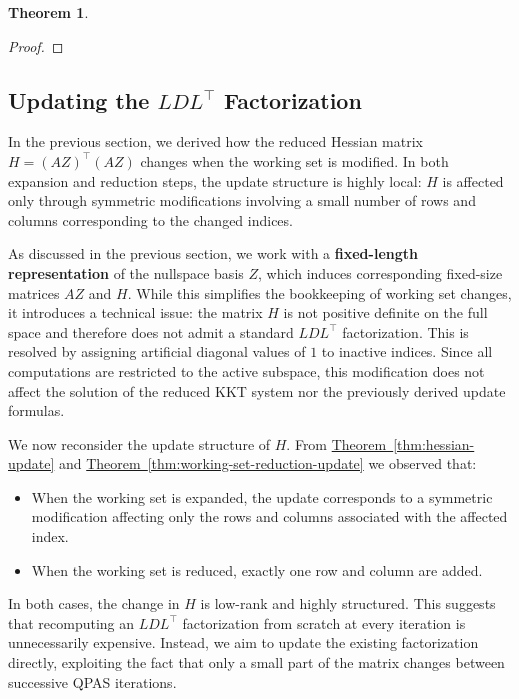 \documentclass{book}
\theoremstyle{definition}
\newtheorem{theorem}{Theorem}[section]
\newcommand{\thref}[1]{\hyperref[#1]{Theorem~\ref*{#1}}}
\numberwithin{algorithm_}{chapter}
\begin{document}
{\begin{theorem}
\begin{proof}
\end{proof}
\end{theorem}




\subsection{Updating the \(LDL^\top\) Factorization}
\label{subsec:updating_ldl}

In the previous section, we derived how the reduced Hessian matrix \(H = (AZ)^\top (AZ)\) changes when the working set is modified. In both expansion and reduction steps, the update structure is highly local: \(H\) is affected only through symmetric modifications involving a small number of rows and columns corresponding to the changed indices.

\bigskip

As discussed in the previous section, we work with a \textbf{fixed-length representation} of the nullspace basis \(Z\), which induces corresponding fixed-size matrices \(AZ\) and \(H\). While this simplifies the bookkeeping of working set changes, it introduces a technical issue: the matrix \(H\) is not positive definite on the full space and therefore does not admit a standard \(LDL^\top\) factorization. This is resolved by assigning artificial diagonal values of $1$ to inactive indices. Since all computations are restricted to the active subspace, this modification does not affect the solution of the reduced KKT system nor the previously derived update formulas.

\bigskip

We now reconsider the update structure of \(H\). From \thref{thm:hessian-update} and \thref{thm:working-set-reduction-update} we observed that:
\begin{itemize}
    \item When the working set is expanded, the update corresponds to a symmetric modification affecting only the rows and columns associated with the affected index.
    \item When the working set is reduced, exactly one row and column are added.
\end{itemize}

In both cases, the change in \(H\) is low-rank and highly structured. This suggests that recomputing an \(LDL^\top\) factorization from scratch at every iteration is unnecessarily expensive. Instead, we aim to update the existing factorization directly, exploiting the fact that only a small part of the matrix changes between successive QPAS iterations.


}
\end{document}

